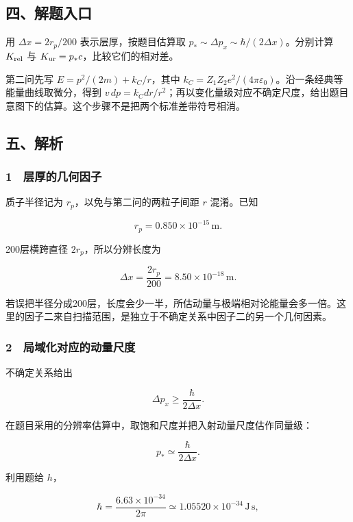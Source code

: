 \documentclass[12pt,a4paper,fontset=fandol]{ctexart}
\begin{document}
\subsection{四、解题入口}\label{ux56dbux89e3ux9898ux5165ux53e3-3}

用 \(\Delta x=2r_p/200\) 表示层厚，按题目估算取
\(p_*\sim\Delta p_x\sim\hbar/(2\Delta x)\)。分别计算 \(K_{\rm rel}\) 与
\(K_{\rm ur}=p_*c\)，比较它们的相对差。

第二问先写 \(E=p^2/(2m)+k_C/r\)，其中
\(k_C=Z_1Z_2e^2/(4\pi\varepsilon_0)\)。沿一条经典等能量曲线取微分，得到
\(v\,dp=k_Cdr/r^2\)；再以变化量级对应不确定尺度，给出题目意图下的估算。这个步骤不是把两个标准差带符号相消。

\subsection{五、解析}\label{ux4e94ux89e3ux6790-3}

\subsubsection{1　层厚的几何因子}\label{ux5c42ux539aux7684ux51e0ux4f55ux56e0ux5b50}

质子半径记为 \(r_p\)，以免与第二问的两粒子间距 \(r\) 混淆。已知

\[r_p=0.850\times10^{-15}\,\mathrm m.\]

200层横跨直径 \(2r_p\)，所以分辨长度为

\[\boxed{\Delta x=\frac{2r_p}{200}
=8.50\times10^{-18}\,\mathrm m.}\]

若误把半径分成200层，长度会少一半，所估动量与极端相对论能量会多一倍。这里的因子二来自扫描范围，是独立于不确定关系中因子二的另一个几何因素。

\subsubsection{2　局域化对应的动量尺度}\label{ux5c40ux57dfux5316ux5bf9ux5e94ux7684ux52a8ux91cfux5c3aux5ea6}

不确定关系给出

\[\Delta p_x\ge\frac\hbar{2\Delta x}.\]

在题目采用的分辨率估算中，取饱和尺度并把入射动量尺度估作同量级：

\[\boxed{p_*\simeq\frac\hbar{2\Delta x}.}\]

利用题给 \(h\)，

\[\hbar=\frac{6.63\times10^{-34}}{2\pi}
\simeq1.05520\times10^{-34}\,\mathrm{J\,s},\]
\end{document}
